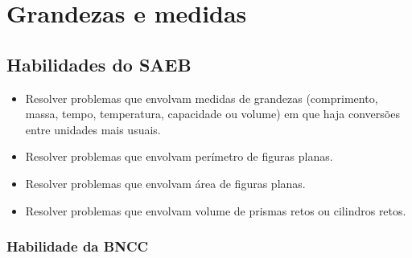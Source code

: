 

\chapter{Grandezas e medidas}

\section{Habilidades do SAEB}

\begin{itemize}
\item
  Resolver problemas que envolvam medidas de grandezas (comprimento,
  massa, tempo, temperatura, capacidade ou volume) em que haja
  conversões entre unidades mais usuais.
\item
  Resolver problemas que envolvam perímetro de figuras planas.
\item
  Resolver problemas que envolvam área de figuras planas.
\item
  Resolver problemas que envolvam volume de prismas retos ou cilindros
  retos.
\end{itemize}

\subsection{Habilidade da BNCC} 

